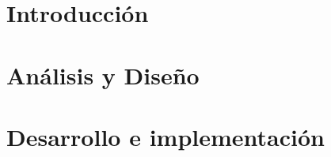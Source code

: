 \documentclass[10pt]{report}
\author{\textbf{Autor}}
		{Alan Fernando Rincón Vieyra}{}{}
\title{\varProyecto}
\subtitle {\varDocumento}
\begin{document}
        \maketitle
        
        \tableofcontents
        
        
        \chapter{Introducción}
        \label{ch:introduccion}
        
        
        \chapter{Análisis y Diseño}
        \label{ch:analisis}
        
        
        \chapter{Desarrollo e implementación}
        \label{ch:avances}
        
        
        

	\printbibliography[heading=bibintoc, title={Bibliografía}]
\end{document}
